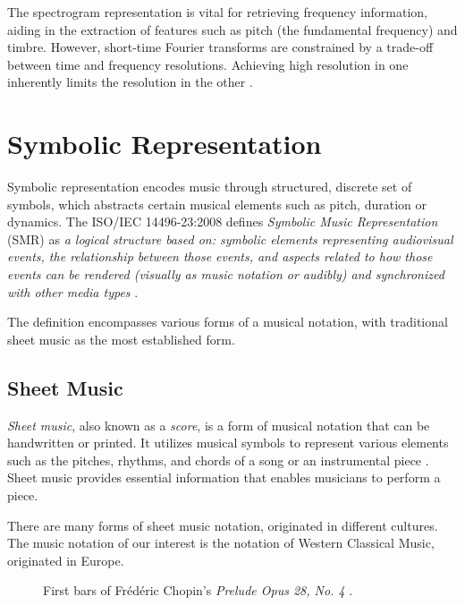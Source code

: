 The spectrogram representation is vital for retrieving frequency information, aiding in the extraction of features such as pitch (the fundamental frequency) and timbre. However, short-time Fourier transforms are constrained by a trade-off between time and frequency resolutions. Achieving high resolution in one inherently limits the resolution in the other \cite[p.~365--366]{Smith1999}.

\section{Symbolic Representation}

Symbolic representation encodes music through structured, discrete set of symbols, which abstracts certain musical elements such as pitch, duration or dynamics. The ISO/IEC 14496-23:2008 defines \emph{Symbolic Music Representation} (SMR) as \emph{a logical structure based on: symbolic elements representing audiovisual events, the relationship between those events, and aspects related to how those events can be rendered (visually as music notation or audibly) and synchronized with other media types} \cite{ISO2008}.

The definition encompasses various forms of a musical notation, with traditional sheet music as the most established form.

\subsection{Sheet Music}

\emph{Sheet music}, also known as a \emph{score}, is a form of musical notation that can be handwritten or printed. It utilizes musical symbols to represent various elements such as the pitches, rhythms, and chords of a song or an instrumental piece \cite{Wiki2024B}. Sheet music provides essential information that enables musicians to perform a piece.

There are many forms of sheet music notation, originated in different cultures. The music notation of our interest is the notation of Western Classical Music, originated in Europe.

\begin{figure}[ht!]
\centering

\caption[First bars of Frédéric Chopin's \emph{Prelude Opus 28, No. 4}.]{First bars of Frédéric Chopin's \emph{Prelude Opus 28, No. 4} \cite{Chopin1839}.}
\label{prelude_opus_28_4}
\end{figure}

